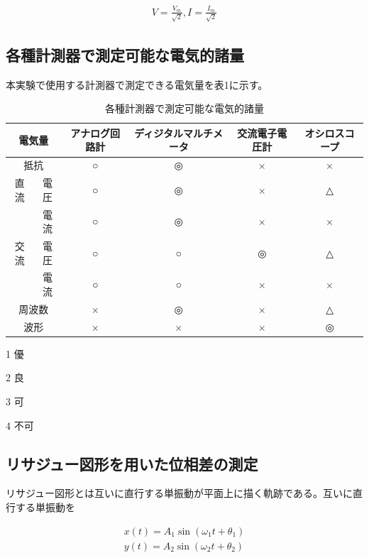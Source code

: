 \documentclass[dvipdfmx]{jsarticle}
\begin{document}
\begin{eqnarray}
V = \frac{V_m}{\sqrt{2}}, I = \frac{I_m}{\sqrt2}
\end{eqnarray}

\subsection{各種計測器で測定可能な電気的諸量}

本実験で使用する計測器で測定できる電気量を表1に示す。

\begin{table}[h]
  \caption{各種計測器で測定可能な電気的諸量}
  \begin{threeparttable}
    \begin{tabular}{|c|c|c|c|c|c|}\hline 
      \multicolumn{2}{|c|}{電気量} & アナログ回路計 & ディジタルマルチメータ & 交流電子電圧計 & オシロスコープ \\ \hline
      \multicolumn{2}{|c|}{抵抗} & ○\footnotemark[2] & ◎\footnotemark[1] & ×\footnotemark[4] & × \\ \cline{1-6}
      直流 & 電圧 & ○ & ◎ & × & △\footnotemark[3]\\ \cline{2-6}
       & 電流 & ○ & ◎ & × & ×\\ \hline
      交流 & 電圧 & ○ & ○ & ◎ & △\\ \cline{2-6}
       & 電流 & ○ & ○ & × & ×\\ \hline
      \multicolumn{2}{|c|}{周波数} & × & ◎ & × & △\\ \hline
      \multicolumn{2}{|c|}{波形} & ×  & ×  & ×  & ◎ \\ \hline 
    \end{tabular}
    \begin{tablenotes}\footnotesize
      \item[1] 優
      \item[2] 良
      \item[3] 可
      \item[4] 不可
      \end{tablenotes}
\end{threeparttable}
\end{table}
\subsection{リサジュー図形を用いた位相差の測定}

リサジュー図形とは互いに直行する単振動が平面上に描く軌跡である。互いに直行する単振動を

\begin{eqnarray}
  x(t) = A_1\sin(\omega_1 t + \theta_1) \\
	y(t) = A_2\sin(\omega_2 t + \theta_2) 
\end{eqnarray}
\end{document}
